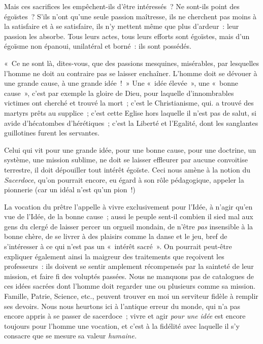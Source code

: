 \documentclass[french,twoside]{book} %
\begin{document}
Mais ces sacrifices les empêchent-ils d’être intéressés ? Ne sont-ils point des égoïstes ? S’ils n’ont qu’une seule passion maîtresse, ils ne cherchent pas moins à la satisfaire et à se satisfaire, ils n’y mettent même que plus d’ardeur : leur passion les absorbe. Tous leurs actes, tous leurs efforts sont égoïstes, mais d’un égoïsme non épanoui, unilatéral et borné : ils sont possédés.\par
« Ce ne sont là, dites-vous, que des passions mesquines, misérables, par lesquelles l’homme ne doit au contraire pas se laisser enchaîner. L’homme doit se dévouer à une grande cause, à une grande idée ! » Une « idée élevée », une « bonne cause », c’est par exemple la gloire de Dieu, pour laquelle d’innombrables victimes ont cherché et trouvé la mort ; c’est le Christianisme, qui. a trouvé des martyrs prêts au supplice ; c’est cette Eglise hors laquelle il n’est pas de salut, si avide d’hécatombes d’hérétiques ; c’est la Liberté et l’Egalité, dont les sanglantes guillotines furent les servantes.\par
Celui qui vit pour une grande idée, pour une bonne cause, pour une doctrine, un système, une mission sublime, ne doit se laisser effleurer par aucune convoitise terrestre, il doit dépouiller tout intérêt égoïste. Ceci nous amène à la notion du \emph{Sacerdoce}, qu’on pourrait encore, eu égard à son rôle pédagogique,  appeler la pionnerie (car un idéal n’est qu’un pion !)\par
La vocation du prêtre l’appelle à vivre exclusivement pour l’Idée, à n’agir qu’en vue de l’Idée, de la bonne cause ; aussi le peuple sent-il combien il sied mal aux gens du clergé de laisser percer un orgueil mondain, de n’être \emph{pas} insensible à la bonne chère, de se livrer à des plaisirs comme la danse et le jeu, bref de s’intéresser à ce qui n’est pas un « intérêt sacré ». On pourrait peut-être expliquer également ainsi la maigreur des traitements que reçoivent les professeurs : ils doivent se sentir amplement récompensés par la sainteté de leur mission, et faire fi des voluptés passées. Nous ne manquons pas de catalogues de ces idées sacrées dont l’homme doit regarder une ou plusieurs comme sa mission. Famille, Patrie, Science, etc., peuvent trouver en moi un serviteur fidèle à remplir ses devoirs. Nous nous heurtons ici à l’antique erreur du monde, qui n’a pas encore appris à se passer de sacerdoce ; vivre et agir \emph{pour une idée} est encore toujours pour l’homme une vocation, et c’est à la fidélité avec laquelle il s’y consacre que se mesure sa valeur \emph{humaine.}\par
\end{document}
